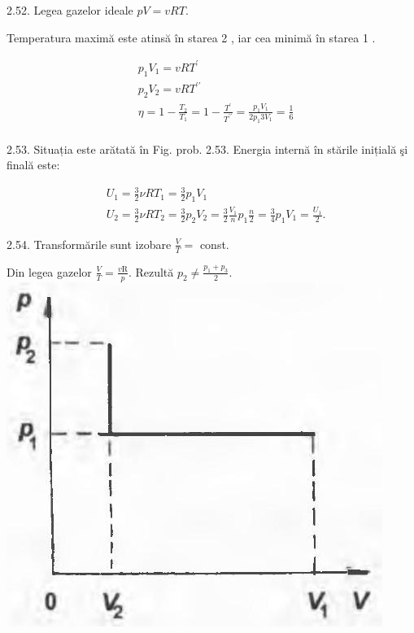 \documentclass[10pt]{article}
\begin{document}
2.52. Legea gazelor ideale $p V=v R T$.

Temperatura maximă este atinsă în starea 2 , iar cea minimă în starea 1 .

$$
\begin{aligned}
& p_{1} V_{1}=v R T^{\prime} \\
& p_{2} V_{2}=v R T^{\prime \prime} \\
& \eta=1-\frac{T_{2}}{T_{1}}=1-\frac{T^{\prime}}{T^{\prime \prime}}=\frac{p_{1} V_{1}}{2 p_{1} 3 V_{1}}=\frac{1}{6} \\
&
\end{aligned}
$$

2.53. Situația este arătată în Fig. prob. 2.53. Energia internă în stările inițială şi finală este:

$$
\begin{aligned}
& U_{1}=\frac{3}{2} \nu R T_{1}=\frac{3}{2} p_{1} V_{1} \\
& U_{2}=\frac{3}{2} \nu R T_{2}=\frac{3}{2} p_{2} V_{2}=\frac{3}{2} \frac{V_{1}}{n} p_{1} \frac{n}{2}=\frac{3}{4} p_{1} V_{1}=\frac{U_{1}}{2} .
\end{aligned}
$$

2.54. Transformările sunt izobare $\frac{V}{T}=$ const.

Din legea gazelor $\frac{V}{T}=\frac{v \mathrm{R}}{p}$. Rezultă $p_{2} \neq \frac{p_{1}+p_{3}}{2}$.\\
\includegraphics[max width=\textwidth, center]{2025_07_01_5b3ff9fa0d508c8e9f17g-281(1)}
\end{document}
